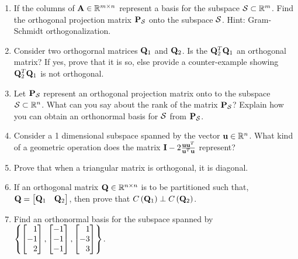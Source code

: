 \documentclass[9pt]{article}
\def\mf{\ensuremath\mathbf}
\def\mb{\ensuremath\mathbb}
\def\mc{\ensuremath\mathcal}
\def\lp{\ensuremath\left(}
\def\rp{\ensuremath\right)}
\def\lc{\ensuremath\left\{}
\def\rc{\ensuremath\right\}}
\def\bmx{\ensuremath\begin{bmatrix*}[r]}
\def\emx{\ensuremath\end{bmatrix*}}
\begin{document}
\begin{multicols}{2}
\begin{enumerate}
    \item If the columns of $\mf{A} \in \mb{R}^{m \times n}$ represent a basis for the subspace $\mc{S} \subset \mb{R}^m$. Find the orthogonal projection matrix $\mf{P}_\mc{S}$ onto the subspace $\mc{S}$. Hint: Gram-Schmidt orthogonalization.

    \item Consider two orthogornal matrices $\mf{Q}_1$ and $\mf{Q}_2$. Is the $\mf{Q}_2^T\mf{Q}_1$ an orthogonal matrix? If yes, prove that it is so, else provide a counter-example showing $\mf{Q}_2^T\mf{Q}_1$ is not orthogonal.

    \item Let $\mf{P}_\mc{S}$ represent an orthogonal projection matrix onto to the subspace $\mc{S} \subset \mb{R}^n$. What can you say about the rank of the matrix $\mf{P}_\mc{S}$? Explain how you can obtain an orthonormal basis for $\mc{S}$ from $\mf{P}_\mc{S}$.

    \item Consider a 1 dimensional subspace spanned by the vector $\mf{u} \in \mb{R}^n$. What kind of a geometric operation does the matrix $\mf{I} - 2\frac{\mf{u}\mf{u}^T}{\mf{u}^T\mf{u}}$ represent?

    \item Prove that when a triangular matrix is orthogonal, it is diagonal.

    \item If an orthogonal matrix $\mf{Q} \in \mb{R}^{n \times n}$ is to be partitioned such that, $\mf{Q} = \bmx \mf{Q}_1 & \mf{Q}_2\emx$, then prove that $C\lp\mf{Q}_1\rp \perp C\lp\mf{Q}_2\rp$.

    \item Find an orthonormal basis for the subspace spanned by $\lc \bmx1\\-1\\2\emx, \bmx-1\\-1\\-1\emx, \bmx1\\-3\\3\emx \rc$.

\end{enumerate}


\end{multicols}
\end{document}
